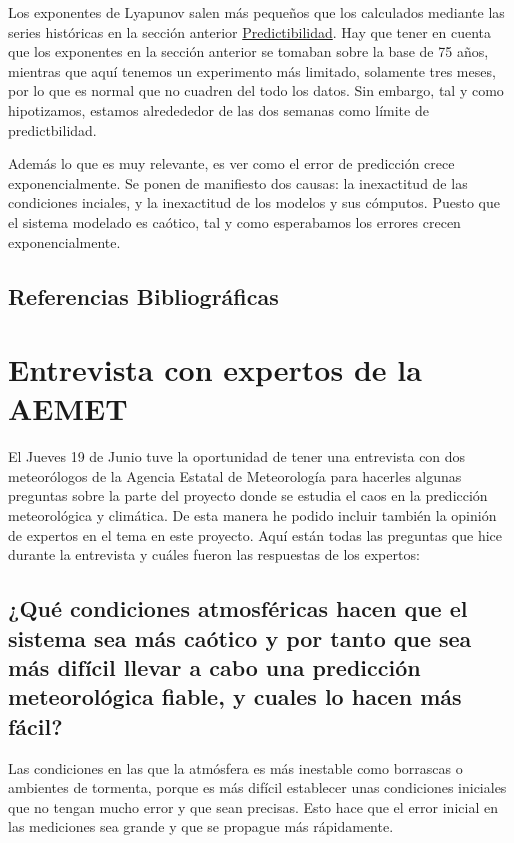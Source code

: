 \documentclass[
  11pt,
  a4paper,
  DIV=11,
  numbers=noendperiod]{scrreprt}
\begin{document}
Los exponentes de Lyapunov salen más pequeños que los calculados
mediante las series históricas en la sección anterior
\hyperref[sec-lyapunov]{Predictibilidad}. Hay que tener en cuenta que
los exponentes en la sección anterior se tomaban sobre la base de 75
años, mientras que aquí tenemos un experimento más limitado, solamente
tres meses, por lo que es normal que no cuadren del todo los datos. Sin
embargo, tal y como hipotizamos, estamos alredededor de las dos semanas
como límite de predictbilidad.

Además lo que es muy relevante, es ver como el error de predicción crece
exponencialmente. Se ponen de manifiesto dos causas: la inexactitud de
las condiciones inciales, y la inexactitud de los modelos y sus
cómputos. Puesto que el sistema modelado es caótico, tal y como
esperabamos los errores crecen exponencialmente.

\section{Referencias
Bibliográficas}\label{referencias-bibliogruxe1ficas}

\chapter{Entrevista con expertos de la
AEMET}\label{entrevista-con-expertos-de-la-aemet}

El Jueves 19 de Junio tuve la oportunidad de tener una entrevista con
dos meteorólogos de la Agencia Estatal de Meteorología para hacerles
algunas preguntas sobre la parte del proyecto donde se estudia el caos
en la predicción meteorológica y climática. De esta manera he podido
incluir también la opinión de expertos en el tema en este proyecto. Aquí
están todas las preguntas que hice durante la entrevista y cuáles fueron
las respuestas de los expertos:

\section{¿Qué condiciones atmosféricas hacen que el sistema sea más
caótico y por tanto que sea más difícil llevar a cabo una predicción
meteorológica fiable, y cuales lo hacen más
fácil?}\label{quuxe9-condiciones-atmosfuxe9ricas-hacen-que-el-sistema-sea-muxe1s-cauxf3tico-y-por-tanto-que-sea-muxe1s-difuxedcil-llevar-a-cabo-una-predicciuxf3n-meteoroluxf3gica-fiable-y-cuales-lo-hacen-muxe1s-fuxe1cil}

Las condiciones en las que la atmósfera es más inestable como borrascas
o ambientes de tormenta, porque es más difícil establecer unas
condiciones iniciales que no tengan mucho error y que sean precisas.
Esto hace que el error inicial en las mediciones sea grande y que se
propague más rápidamente.
\end{document}
